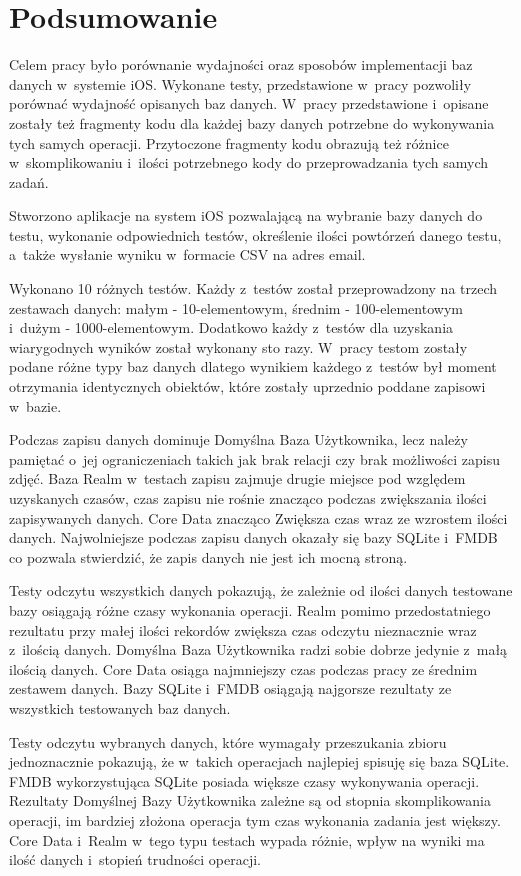 \section{Podsumowanie}

Celem pracy było porównanie wydajności oraz sposobów implementacji baz danych w~systemie iOS. Wykonane testy, przedstawione w~pracy pozwoliły porównać wydajność opisanych  baz danych. W~pracy przedstawione i~opisane zostały też fragmenty kodu dla każdej bazy danych potrzebne do wykonywania tych samych operacji. Przytoczone fragmenty kodu obrazują też różnice w~skomplikowaniu i~ilości potrzebnego kody do przeprowadzania tych samych zadań. 

Stworzono aplikacje na system iOS pozwalającą na wybranie bazy danych do testu, wykonanie odpowiednich testów, określenie ilości powtórzeń danego testu, a~także wysłanie wyniku w~formacie CSV na adres email. 

Wykonano 10 różnych testów. Każdy z~testów został przeprowadzony na trzech zestawach danych: małym - 10-elementowym, średnim - 100-elementowym i~dużym - 1000-elementowym. Dodatkowo każdy z~testów dla uzyskania wiarygodnych wyników został wykonany sto razy. W~pracy testom zostały podane różne typy baz danych dlatego wynikiem każdego z~testów był moment otrzymania identycznych obiektów, które zostały uprzednio poddane zapisowi w~bazie. 

Podczas zapisu danych dominuje Domyślna Baza Użytkownika, lecz należy pamiętać o~jej ograniczeniach takich jak brak relacji czy brak możliwości zapisu zdjęć. Baza Realm w~testach zapisu zajmuje drugie miejsce pod względem uzyskanych czasów, czas zapisu nie rośnie znacząco podczas zwiększania ilości zapisywanych danych. Core Data znacząco Zwiększa czas wraz ze wzrostem ilości danych. Najwolniejsze podczas zapisu danych okazały się bazy SQLite i~FMDB co pozwala stwierdzić, że zapis danych nie jest ich mocną stroną. 

Testy odczytu wszystkich danych pokazują, że zależnie od ilości danych testowane bazy osiągają różne czasy wykonania operacji. Realm pomimo przedostatniego rezultatu przy małej ilości rekordów zwiększa czas odczytu nieznacznie wraz z~ilością danych. Domyślna Baza Użytkownika radzi sobie dobrze jedynie z~małą ilością danych. Core Data osiąga najmniejszy czas podczas pracy ze średnim zestawem danych. Bazy SQLite i~FMDB osiągają najgorsze rezultaty ze wszystkich testowanych baz danych. 

Testy odczytu wybranych danych, które wymagały przeszukania zbioru jednoznacznie pokazują, że w~takich operacjach najlepiej spisuję się baza SQLite. FMDB wykorzystująca SQLite posiada większe czasy wykonywania operacji. Rezultaty Domyślnej Bazy Użytkownika zależne są od stopnia skomplikowania operacji, im bardziej złożona operacja tym czas wykonania zadania jest większy. Core Data i~Realm w~tego typu testach wypada różnie, wpływ na wyniki ma ilość danych i~stopień trudności operacji.

